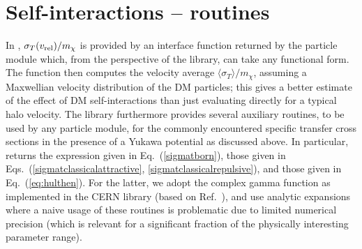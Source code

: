 \section{Self-interactions -- routines}

In \ds, $\sigma_T(v_{\rm rel})/m_\chi$ is provided by an interface function  returned
by the particle module which, from the perspective of the  library, can take any functional form.
The function   then computes the velocity average $\langle\sigma_T\rangle/m_\chi$,
assuming a Maxwellian velocity distribution of the DM particles; this gives a better estimate of the 
effect of DM self-interactions than just evaluating  directly for a typical halo 
velocity.
The  library furthermore provides several auxiliary routines, to be used by
any  particle module, for the commonly encountered specific transfer cross sections 
in the presence of a Yukawa potential as discussed above. In particular,  returns the expression given in
Eq.~(\ref{sigmatborn}),  those given in Eqs.~(\ref{sigmatclassicalattractive}, 
\ref{sigmatclassicalrepulsive}), and  those given in Eq.~(\ref{eq:hulthen}).
For the latter, we adopt the complex gamma function as implemented in the CERN library 
(based on Ref.~\cite{Luke:1969:SFTb}), and use analytic expansions where a naive usage
of these routines is problematic due to limited numerical precision (which is relevant for a significant
fraction of the physically interesting parameter range).

